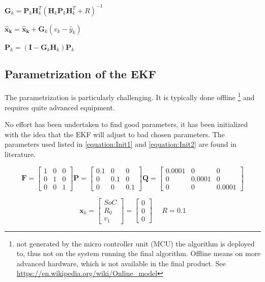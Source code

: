 $\boldsymbol G_k = \boldsymbol P_k \boldsymbol H^T_k (\boldsymbol H_k \boldsymbol P_k \boldsymbol H^T_k +  R)^{-1}$

$\boldsymbol {\hat{x}_k} = \boldsymbol  {\hat{x}_k} + \boldsymbol G_k(v_k - \hat{y}_k)$
 

$\boldsymbol P_k = (\boldsymbol I - \boldsymbol G_k \boldsymbol H_k) \boldsymbol P_k$ \\



\subsection{Parametrization of the EKF}
\label{Parametrization}

The parametrization is particularly challenging. It is typically done offline \footnote{not generated by the micro controller unit (MCU) the algorithm is deployed to, thus not on the system running the final algorithm. Offline means on more advanced hardware, which is not available in the final product. See \url{https://en.wikipedia.org/wiki/Online_model} } and requires quite advanced equipment.

No effort has been undertaken to find good parameters, it has been initialized with the idea that the EKF will adjust to bad chosen parameters. The parameters used listed in \ref{equation:Init1} and \ref{equation:Init2} are found in literature. %

\begin{equation}
 \boldsymbol F= 
 \begin{bmatrix}
 1 & 0 & 0\\
 0 & 1 & 0\\
 0 & 0 & 1
 \end{bmatrix} 
 \boldsymbol P= 
 \begin{bmatrix}
 0.1 & 0 & 0\\
 0 & 0.1 & 0\\
 0 & 0 & 0.1
 \end{bmatrix}
  \boldsymbol Q= 
  \begin{bmatrix}
  0.0001 & 0 & 0\\
  0 & 0.0001 & 0\\
  0 & 0 & 0.0001
  \end{bmatrix}
\label{equation:Init1} 
\end{equation} 

\begin{equation}
 \boldsymbol x_k = 
\begin{bmatrix}
SoC \\
R_0 \\
v_1
\end{bmatrix} = 
\begin{bmatrix}
0\\
0 \\
0
\end{bmatrix}  
\ \ \ \ \ \ R = 0.1
\label{equation:Init2}
\end{equation}



